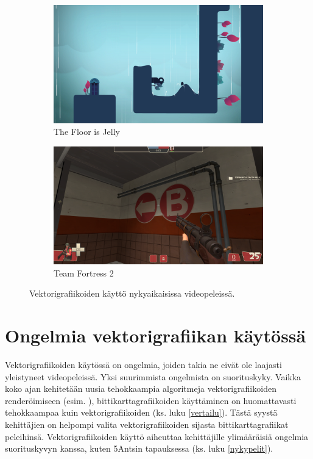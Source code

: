 \documentclass[utf8,bachelor]{gradu3}
\begin{document}
\begin{figure} [!b]
    \begin{subfigure}[t]{0.5\textwidth}
        \centering
        \includegraphics[width=0.8\linewidth]{jelly.png}
        \caption{The Floor is Jelly \parencite{RefWorks:doc:5beea20ce4b06f8a51cf9f11}}\label{jelly}
    \end{subfigure}
    \begin{subfigure}[t]{0.5\textwidth}
        \centering
        \includegraphics[width=0.8\linewidth]{tf2.png}
        \caption{Team Fortress 2 \parencite{RefWorks:doc:5bf037f1e4b0a014899520eb}}\label{tf2}
    \end{subfigure}
    \caption{Vektorigrafiikoiden käyttö nykyaikaisissa videopeleissä.}
\end{figure}

\section{Ongelmia vektorigrafiikan käytössä}


Vektorigrafiikoiden käytössä on ongelmia, joiden takia ne eivät ole laajasti yleistyneet videopeleissä. Yksi suurimmista ongelmista on suorituskyky. Vaikka koko ajan kehitetään uusia tehokkaampia algoritmeja vektorigrafiikoiden renderöimiseen (esim. \cite{RefWorks:doc:5bc4a5cce4b080e02f7eff1b}), bittikarttagrafiikoiden käyttäminen on huomattavasti tehokkaampaa kuin vektorigrafiikoiden (ks. luku \ref{vertailu}). Tästä syystä kehittäjien on helpompi valita vektorigrafiikoiden sijasta bittikarttagrafiikat peleihinsä. Vektorigrafiikoiden käyttö aiheuttaa kehittäjille ylimääräisiä ongelmia suorituskyvyn kanssa, kuten 5Antsin tapauksessa (ks. luku \ref{nykypelit}).
\end{document}
